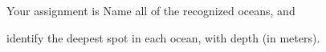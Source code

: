 \documentclass[t]{beamer}
\begin{document}

{
\begin{frame}[t]
\end{frame}
}

{
\begin{frame}[t]
\end{frame}
}

{
\begin{frame}[t]
\end{frame}
}



\begin{frame}[t]{Your  assignment is}
	\hangpara Name all of the recognized oceans, and

	\hangpara identify the deepest spot in each ocean, with depth (in meters).
\end{frame}
\end{document}
